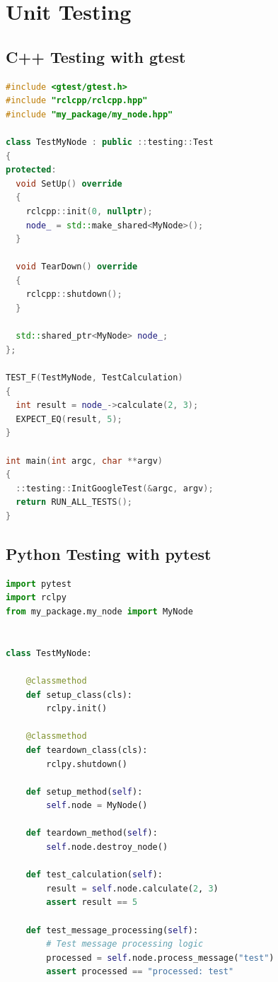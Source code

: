 \documentclass[a4paper,12pt]{book}
\begin{document}
\section{Unit Testing}

\subsection{C++ Testing with gtest}

\begin{lstlisting}[language=CPP, caption=Unit Test Example in C++]
#include <gtest/gtest.h>
#include "rclcpp/rclcpp.hpp"
#include "my_package/my_node.hpp"

class TestMyNode : public ::testing::Test
{
protected:
  void SetUp() override
  {
    rclcpp::init(0, nullptr);
    node_ = std::make_shared<MyNode>();
  }

  void TearDown() override
  {
    rclcpp::shutdown();
  }

  std::shared_ptr<MyNode> node_;
};

TEST_F(TestMyNode, TestCalculation)
{
  int result = node_->calculate(2, 3);
  EXPECT_EQ(result, 5);
}

int main(int argc, char **argv)
{
  ::testing::InitGoogleTest(&argc, argv);
  return RUN_ALL_TESTS();
}
\end{lstlisting}

\subsection{Python Testing with pytest}

\begin{lstlisting}[language=Python, caption=Unit Test Example in Python]
import pytest
import rclpy
from my_package.my_node import MyNode


class TestMyNode:

    @classmethod
    def setup_class(cls):
        rclpy.init()

    @classmethod
    def teardown_class(cls):
        rclpy.shutdown()

    def setup_method(self):
        self.node = MyNode()

    def teardown_method(self):
        self.node.destroy_node()

    def test_calculation(self):
        result = self.node.calculate(2, 3)
        assert result == 5

    def test_message_processing(self):
        # Test message processing logic
        processed = self.node.process_message("test")
        assert processed == "processed: test"
\end{lstlisting}
\end{document}
